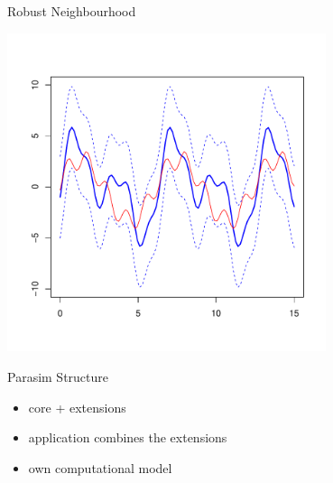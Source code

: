 \documentclass[xcolor=svgnames,14pt]{beamer}
\begin{document}
\begin{frame}{Robust Neighbourhood}%
	\begin{center}\includegraphics[width=0.7\textwidth]{tube.pdf}\end{center}
\end{frame}%
\begin{frame}{Parasim Structure}%
	\begin{itemize}
		\item core + extensions
		\item application combines the extensions
		\item own computational model
	\end{itemize}
\end{frame}%
\end{document}
